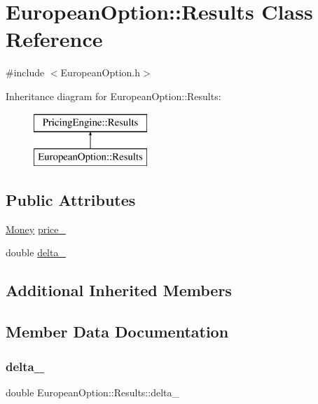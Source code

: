 \hypertarget{class_european_option_1_1_results}{}\section{European\+Option\+:\+:Results Class Reference}
\label{class_european_option_1_1_results}


{\ttfamily \#include $<$European\+Option.\+h$>$}

Inheritance diagram for European\+Option\+:\+:Results\+:\begin{figure}[H]
\begin{center}
\leavevmode
\includegraphics[height=2.000000cm]{class_european_option_1_1_results}
\end{center}
\end{figure}
\subsection*{Public Attributes}
\begin{DoxyCompactItemize}
\item 
\hyperlink{_name_def_8h_a5a9d48c16a694e9a2d9f1eca730dc8c5}{Money} \hyperlink{class_european_option_1_1_results_a517b87143fda866b135b21051dc4fd6c}{price\+\_\+}
\item 
double \hyperlink{class_european_option_1_1_results_a3e9ddb58f8e1f69b972bfed5e893414b}{delta\+\_\+}
\end{DoxyCompactItemize}
\subsection*{Additional Inherited Members}


\subsection{Member Data Documentation}
\hypertarget{class_european_option_1_1_results_a3e9ddb58f8e1f69b972bfed5e893414b}{}\label{class_european_option_1_1_results_a3e9ddb58f8e1f69b972bfed5e893414b} 
\subsubsection{\texorpdfstring{delta\+\_\+}{delta\_}}
{\footnotesize\ttfamily double European\+Option\+::\+Results\+::delta\+\_\+}

